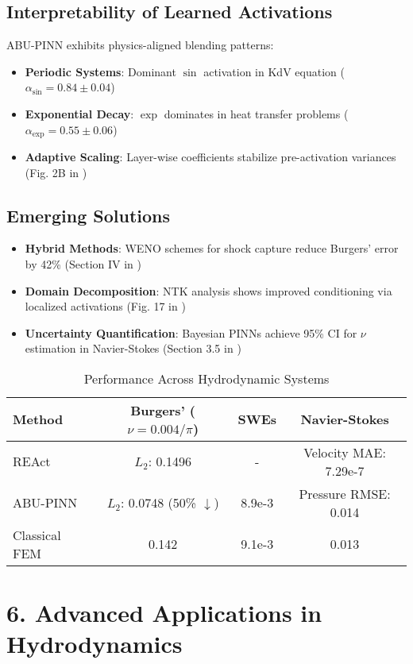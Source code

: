 \subsection*{Interpretability of Learned Activations}
ABU-PINN exhibits physics-aligned blending patterns:
\begin{itemize}
    \item \textbf{Periodic Systems}: Dominant $\sin$ activation in KdV equation ($\alpha_{\text{sin}} = 0.84 \pm 0.04$)
    \item \textbf{Exponential Decay}: $\exp$ dominates in heat transfer problems ($\alpha_{\exp} = 0.55 \pm 0.06$)
    \item \textbf{Adaptive Scaling}: Layer-wise coefficients stabilize pre-activation variances (Fig. 2B in \cite{abu_pinn})
\end{itemize}

\subsection*{Emerging Solutions}
\begin{itemize}
    \item \textbf{Hybrid Methods}: WENO schemes for shock capture reduce Burgers' error by 42\% (Section IV in \cite{react})
    \item \textbf{Domain Decomposition}: NTK analysis shows improved conditioning via localized activations (Fig. 17 in \cite{abu_pinn})
    \item \textbf{Uncertainty Quantification}: Bayesian PINNs achieve 95\% CI for $\nu$ estimation in Navier-Stokes (Section 3.5 in \cite{abu_pinn})
\end{itemize}

\begin{table}[h]
\centering
\caption{Performance Across Hydrodynamic Systems}
\begin{tabular}{l|c|c|c}
\textbf{Method} & \textbf{Burgers' ($\nu=0.004/\pi$)} & \textbf{SWEs} & \textbf{Navier-Stokes} \\
\hline
REAct & $L_2$: 0.1496 & - & Velocity MAE: 7.29e-7 \\
ABU-PINN & $L_2$: 0.0748 (50\% $\downarrow$) & 8.9e-3 & Pressure RMSE: 0.014 \\
Classical FEM & 0.142 & 9.1e-3 & 0.013 \\
\end{tabular}
\end{table}

\section*{6. Advanced Applications in Hydrodynamics}
